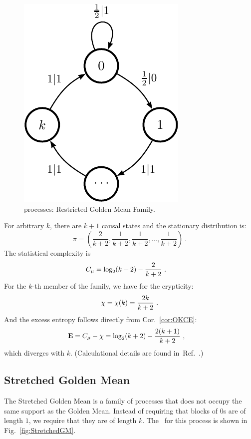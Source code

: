 \begin{figure}[th]
\centering
\includegraphics{../chapter3/figures/restrictedgm}
\caption{ processes: Restricted Golden Mean Family.}
\label{fig:RestrictedGM}
\end{figure}

For arbitrary $k$, there are $k+1$ causal states and the stationary
distribution is:
\begin{equation*}
\pi = \left( \frac{2}{k+2}, \frac{1}{k+2},
	\frac{1}{k+2}, \ldots, \frac{1}{k+2} \right) ~.
\end{equation*}
The statistical complexity is
\begin{align*}
C_\mu &= \log_2 (k+2) - \frac{2}{k+2} ~.
\end{align*}
For the $k$-th member of the family, we have for the crypticity:
\begin{equation*}
\chi = \chi(k) = \frac{2 k}{k+2} ~.
\end{equation*}
And the excess entropy follows directly from Cor.~\ref{cor:OKCE}:
\begin{align*}
{\bf E} & = C_\mu - \chi 
	=  \log_2 (k+2) - \frac{2(k+1)}{k+2} ~,
\end{align*}
which diverges with $k$. (Calculational details are found in~Ref.~\cite{Maho09b}.)

\subsection{Stretched Golden Mean}

The Stretched Golden Mean is a family of processes that does not occupy the
same support as the Golden Mean. Instead of requiring that blocks of 0s are
of length $1$, we require that they are of length $k$. The \eM\ for this process
is shown in Fig.~\ref{fig:StretchedGM}.


